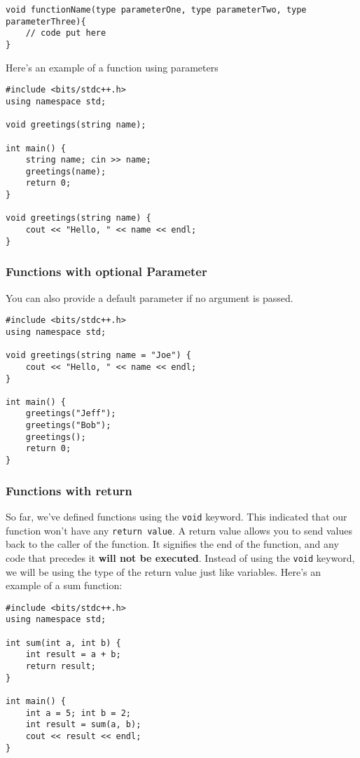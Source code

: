 \documentclass{report}
\begin{document}
\begin{lstlisting}[caption=Function with parameters]
void functionName(type parameterOne, type parameterTwo, type parameterThree){
    // code put here
}
\end{lstlisting}

Here's an example of a function using parameters

\begin{lstlisting}
#include <bits/stdc++.h>
using namespace std;

void greetings(string name);

int main() {
    string name; cin >> name;
    greetings(name);
    return 0;
}

void greetings(string name) {
    cout << "Hello, " << name << endl;
}
\end{lstlisting}


\subsubsection{Functions with optional Parameter}
You can also provide a default parameter if no argument is passed.

\begin{lstlisting}
#include <bits/stdc++.h>
using namespace std;

void greetings(string name = "Joe") {
    cout << "Hello, " << name << endl;
}

int main() {
    greetings("Jeff");
    greetings("Bob");
    greetings();
    return 0;
}
\end{lstlisting}

\subsubsection{Functions with return}
So far, we've defined functions using the \lstinline{void} keyword. This indicated that our function won't have any \lstinline{return value}. A return value allows you to send values back to the caller of the function. It signifies the end of the function, and any code that precedes it \textbf{will not be executed}. Instead of using the \lstinline{void} keyword, we will be using the type of the return value just like variables. Here's an example of a sum function:

\begin{lstlisting}
#include <bits/stdc++.h>
using namespace std;

int sum(int a, int b) {
    int result = a + b;
    return result;
}

int main() {
    int a = 5; int b = 2;
    int result = sum(a, b);
    cout << result << endl;
}
\end{lstlisting}
\end{document}
